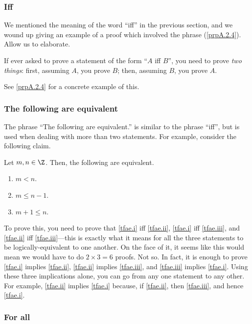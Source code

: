 \subsubsection{Iff}

We mentioned the meaning of the word ``iff'' in the previous section, and we wound up giving an example of a proof which involved the phrase (\cref{prpA.2.4}).  Allow us to elaborate.
\begin{important}
If ever asked to prove a statement of the form ``$A$ iff $B$'', you need to prove \emph{two things}:  first, assuming $A$, you prove $B$; then, assuming $B$, you prove $A$.
\end{important}
See \cref{prpA.2.4} for a concrete example of this.

\subsubsection{The following are equivalent}

The phrase ``The following are equivalent.'' is similar to the phrase ``iff'', but is used when dealing with more than two statements.  For example, consider the following claim.
\begin{important}
Let $m,n\in \Z$.  Then, the following are equivalent.
\begin{enumerate}
\item \label{tfae.i}$m<n$.
\item \label{tfae.ii}$m\leq n-1$.
\item \label{tfae.iii}$m+1\leq n$.
\end{enumerate}
\end{important}
To prove this, you need to prove that \cref{tfae.i} iff \cref{tfae.ii}, \cref{tfae.i} iff \cref{tfae.iii}, and \cref{tfae.ii} iff \cref{tfae.iii}---this is exactly what it means for all the three statements to be logically-equivalent to one another.  On the face of it, it seems like this would mean we would have to do $2\times 3=6$ proofs.  Not so.  In fact, it is enough to prove \cref{tfae.i} implies \cref{tfae.ii}, \cref{tfae.ii} implies \cref{tfae.iii}, and \cref{tfae.iii} implies \cref{tfae.i}.  Using these three implications alone, you can go from any one statement to any other.  For example, \cref{tfae.ii} implies \cref{tfae.i} because, if \cref{tfae.ii}, then \cref{tfae.iii}, and hence \cref{tfae.i}.

\subsubsection{For all\textellipsis}

